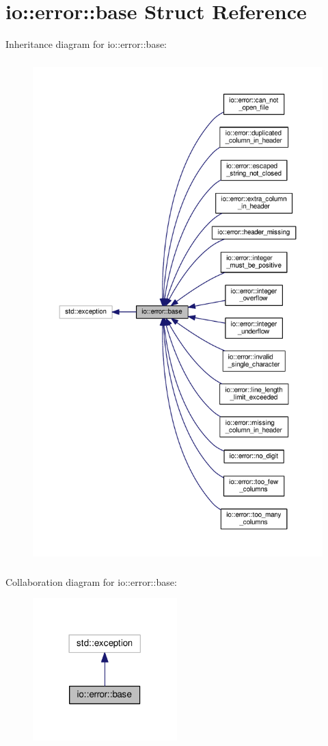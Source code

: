 \section{io\+:\+:error\+:\+:base Struct Reference}
\label{structio_1_1error_1_1base}


Inheritance diagram for io\+:\+:error\+:\+:base\+:\nopagebreak
\begin{figure}[H]
\begin{center}
\leavevmode
\includegraphics[height=550pt]{structio_1_1error_1_1base__inherit__graph}
\end{center}
\end{figure}


Collaboration diagram for io\+:\+:error\+:\+:base\+:\nopagebreak
\begin{figure}[H]
\begin{center}
\leavevmode
\includegraphics[width=158pt]{structio_1_1error_1_1base__coll__graph}
\end{center}
\end{figure}
